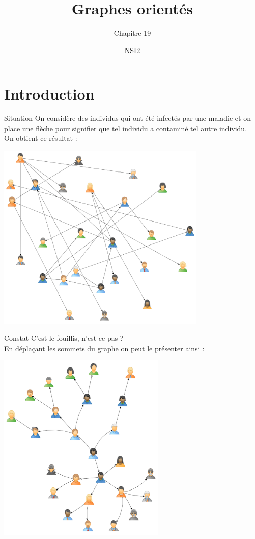 \documentclass[10pt]{beamer}
\title{Graphes orientés}
\subtitle{Chapitre 19}
\author{NSI2}
\begin{document}
\maketitle

\section{Introduction}

\begin{frame}{Situation}
On considère des individus qui ont été infectés par une maladie et on place une flèche pour signifier que tel individu a contaminé tel autre individu.\\
On obtient ce résultat :
\end{frame}
\begin{frame}{}
\begin{center}
\includegraphics[width=10cm]{img/graphe2_random.png}
\end{center}
\end{frame}
\begin{frame}{Constat}
C'est le fouillis, n'est-ce pas ? \\

En déplaçant les sommets du graphe on peut le présenter ainsi :
\end{frame}
\begin{frame}{}
\begin{center}
\includegraphics[width=8cm]{img/graphe2_radial.png}
\end{center}
\end{frame}
\end{document}
